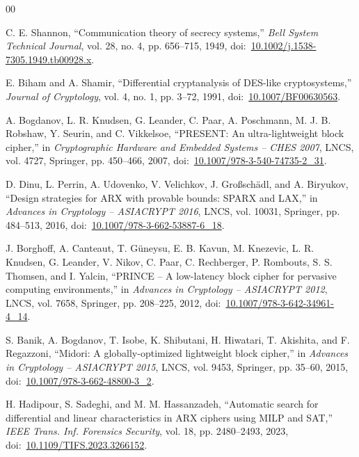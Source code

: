 \documentclass[10pt,twocolumn]{article}
\begin{document}
\begin{thebibliography}{00}
\small
\setlength{\itemsep}{1.5pt plus 0.5pt minus 0.5pt}

C. E. Shannon, ``Communication theory of secrecy systems,'' \textit{Bell System Technical Journal}, vol. 28, no. 4, pp. 656--715, 1949, doi:~\href{https://doi.org/10.1002/j.1538-7305.1949.tb00928.x}{10.1002/j.1538-7305.1949.tb00928.x}.

E. Biham and A. Shamir, ``Differential cryptanalysis of DES-like cryptosystems,'' \textit{Journal of Cryptology}, vol. 4, no. 1, pp. 3--72, 1991, doi:~\href{https://doi.org/10.1007/BF00630563}{10.1007/BF00630563}.

A. Bogdanov, L. R. Knudsen, G. Leander, C. Paar, A. Poschmann, M. J. B. Robshaw, Y. Seurin, and C. Vikkelsoe, ``PRESENT: An ultra-lightweight block cipher,'' in \textit{Cryptographic Hardware and Embedded Systems -- CHES 2007}, LNCS, vol. 4727, Springer, pp. 450--466, 2007, doi:~\href{https://doi.org/10.1007/978-3-540-74735-2_31}{10.1007/978-3-540-74735-2\_31}.

D. Dinu, L. Perrin, A. Udovenko, V. Velichkov, J. Gro{\ss}sch\"{a}dl, and A. Biryukov, ``Design strategies for ARX with provable bounds: SPARX and LAX,'' in \textit{Advances in Cryptology -- ASIACRYPT 2016}, LNCS, vol. 10031, Springer, pp. 484--513, 2016, doi:~\href{https://doi.org/10.1007/978-3-662-53887-6_18}{10.1007/978-3-662-53887-6\_18}.

J. Borghoff, A. Canteaut, T. G\"{u}neysu, E. B. Kavun, M. Knezevic, L. R. Knudsen, G. Leander, V. Nikov, C. Paar, C. Rechberger, P. Rombouts, S. S. Thomsen, and I. Yalcin, ``PRINCE -- A low-latency block cipher for pervasive computing environments,'' in \textit{Advances in Cryptology -- ASIACRYPT 2012}, LNCS, vol. 7658, Springer, pp. 208--225, 2012, doi:~\href{https://doi.org/10.1007/978-3-642-34961-4_14}{10.1007/978-3-642-34961-4\_14}.

S. Banik, A. Bogdanov, T. Isobe, K. Shibutani, H. Hiwatari, T. Akishita, and F. Regazzoni, ``Midori: A globally-optimized lightweight block cipher,'' in \textit{Advances in Cryptology -- ASIACRYPT 2015}, LNCS, vol. 9453, Springer, pp. 35--60, 2015, doi:~\href{https://doi.org/10.1007/978-3-662-48800-3_2}{10.1007/978-3-662-48800-3\_2}.

H. Hadipour, S. Sadeghi, and M. M. Hassanzadeh, ``Automatic search for differential and linear characteristics in ARX ciphers using MILP and SAT,'' \textit{IEEE Trans. Inf. Forensics Security}, vol. 18, pp. 2480--2493, 2023, doi:~\href{https://doi.org/10.1109/TIFS.2023.3266152}{10.1109/TIFS.2023.3266152}.


\end{thebibliography}
\end{document}
